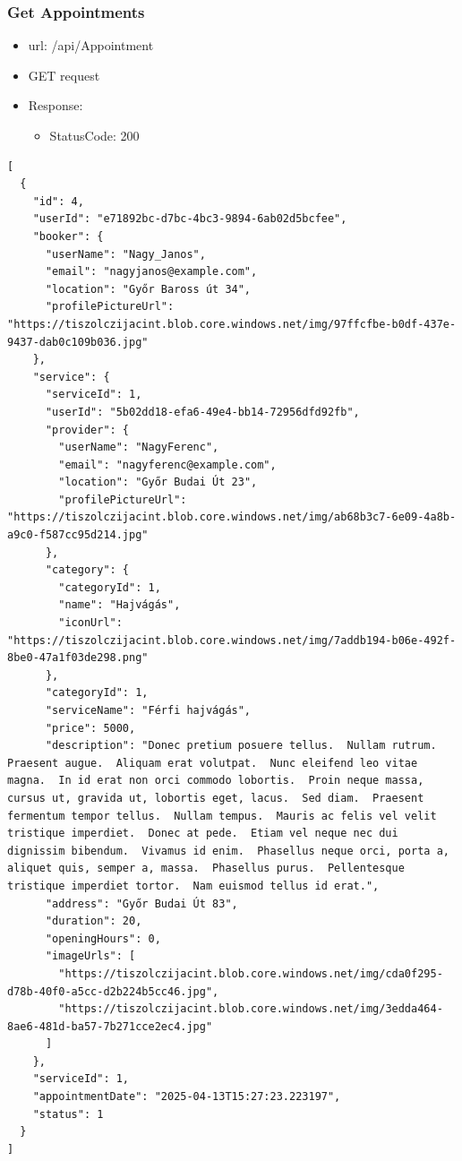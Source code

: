 \documentclass[11pt]{article}
\begin{document}
\subsubsection{Get Appointments}
\label{sec:orgd01442d}
\begin{itemize}
\item url: /api/Appointment
\item GET request
\item Response:
\begin{itemize}
\item StatusCode: 200
\end{itemize}
\end{itemize}
\begin{verbatim}
[
  {
    "id": 4,
    "userId": "e71892bc-d7bc-4bc3-9894-6ab02d5bcfee",
    "booker": {
      "userName": "Nagy_Janos",
      "email": "nagyjanos@example.com",
      "location": "Győr Baross út 34",
      "profilePictureUrl": "https://tiszolczijacint.blob.core.windows.net/img/97ffcfbe-b0df-437e-9437-dab0c109b036.jpg"
    },
    "service": {
      "serviceId": 1,
      "userId": "5b02dd18-efa6-49e4-bb14-72956dfd92fb",
      "provider": {
        "userName": "NagyFerenc",
        "email": "nagyferenc@example.com",
        "location": "Győr Budai Út 23",
        "profilePictureUrl": "https://tiszolczijacint.blob.core.windows.net/img/ab68b3c7-6e09-4a8b-a9c0-f587cc95d214.jpg"
      },
      "category": {
        "categoryId": 1,
        "name": "Hajvágás",
        "iconUrl": "https://tiszolczijacint.blob.core.windows.net/img/7addb194-b06e-492f-8be0-47a1f03de298.png"
      },
      "categoryId": 1,
      "serviceName": "Férfi hajvágás",
      "price": 5000,
      "description": "Donec pretium posuere tellus.  Nullam rutrum.  Praesent augue.  Aliquam erat volutpat.  Nunc eleifend leo vitae magna.  In id erat non orci commodo lobortis.  Proin neque massa, cursus ut, gravida ut, lobortis eget, lacus.  Sed diam.  Praesent fermentum tempor tellus.  Nullam tempus.  Mauris ac felis vel velit tristique imperdiet.  Donec at pede.  Etiam vel neque nec dui dignissim bibendum.  Vivamus id enim.  Phasellus neque orci, porta a, aliquet quis, semper a, massa.  Phasellus purus.  Pellentesque tristique imperdiet tortor.  Nam euismod tellus id erat.",
      "address": "Győr Budai Út 83",
      "duration": 20,
      "openingHours": 0,
      "imageUrls": [
        "https://tiszolczijacint.blob.core.windows.net/img/cda0f295-d78b-40f0-a5cc-d2b224b5cc46.jpg",
        "https://tiszolczijacint.blob.core.windows.net/img/3edda464-8ae6-481d-ba57-7b271cce2ec4.jpg"
      ]
    },
    "serviceId": 1,
    "appointmentDate": "2025-04-13T15:27:23.223197",
    "status": 1
  }
]
\end{verbatim}
\end{document}
